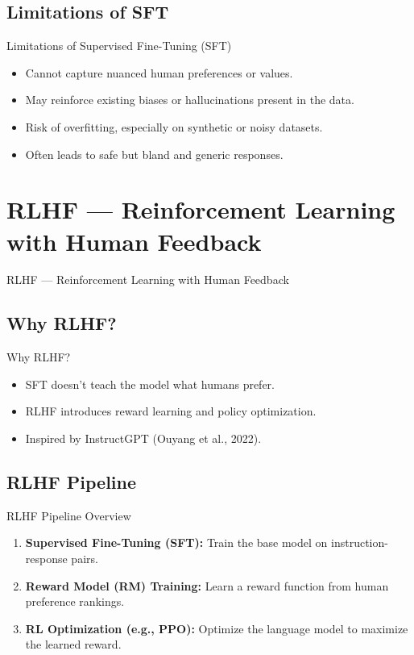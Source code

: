 \subsection{Limitations of SFT}
\begin{frame}{Limitations of Supervised Fine-Tuning (SFT)}
    \begin{itemize}
        \item Cannot capture nuanced human preferences or values.
        \item May reinforce existing biases or hallucinations present in the data.
        \item Risk of overfitting, especially on synthetic or noisy datasets.
        \item Often leads to safe but bland and generic responses.
    \end{itemize}
\end{frame}


\section{RLHF — Reinforcement Learning with Human Feedback}
\begin{frame}{}
    \LARGE RLHF — Reinforcement Learning with Human Feedback
\end{frame}


\subsection{Why RLHF?}
\begin{frame}{Why RLHF?}
    \begin{itemize}
        \item SFT doesn’t teach the model what humans prefer.
        \item RLHF introduces reward learning and policy optimization.
        \item Inspired by InstructGPT (Ouyang et al., 2022).
    \end{itemize}
\end{frame}

\subsection{RLHF Pipeline}
\begin{frame}{RLHF Pipeline Overview}
    \begin{enumerate}
        \item \textbf{Supervised Fine-Tuning (SFT):} Train the base model on instruction-response pairs.
        \item \textbf{Reward Model (RM) Training:} Learn a reward function from human preference rankings.
        \item \textbf{RL Optimization (e.g., PPO):} Optimize the language model to maximize the learned reward.
    \end{enumerate}
\end{frame}

